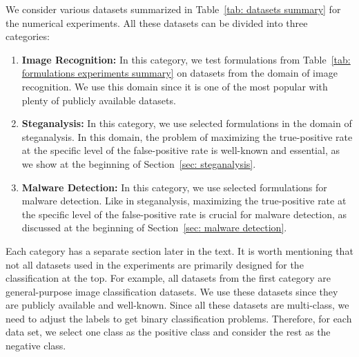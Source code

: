 We consider various datasets summarized in Table~\ref{tab: datasets summary} for the numerical experiments. All these datasets can be divided into three categories:
\begin{enumerate}
  \item \textbf{Image Recognition:} In this category, we test formulations from Table~\ref{tab: formulations experiments summary} on datasets from the domain of image recognition. We use this domain since it is one of the most popular with plenty of publicly available datasets.
  \item \textbf{Steganalysis:} In this category, we use selected formulations in the domain of steganalysis. In this domain, the problem of maximizing the true-positive rate at the specific level of the false-positive rate is well-known and essential, as we show at the beginning of Section~\ref{sec: steganalysis}.
  \item \textbf{Malware Detection:} In this category, we use selected formulations for malware detection. Like in steganalysis, maximizing the true-positive rate at the specific level of the false-positive rate is crucial for malware detection, as discussed at the beginning of Section~\ref{sec: malware detection}.
\end{enumerate}
Each category has a separate section later in the text. It is worth mentioning that not all datasets used in the experiments are primarily designed for the classification at the top. For example, all datasets from the first category are general-purpose image classification datasets. We use these datasets since they are publicly available and well-known. Since all these datasets are multi-class, we need to adjust the labels to get binary classification problems. Therefore, for each data set, we select one class as the positive class and consider the rest as the negative class. 

